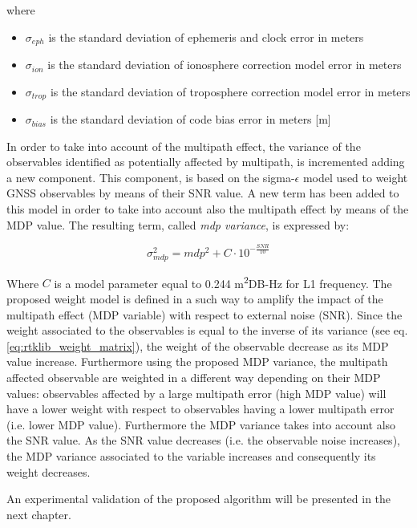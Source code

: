 where
\begin{itemize}
    \item $\sigma_{eph}$ is the standard deviation of ephemeris and clock error in meters
    \item $\sigma_{ion}$ is the standard deviation of ionosphere correction model error in meters
    \item $\sigma_{trop}$ is the standard deviation of troposphere correction model error in meters
    \item $\sigma_{bias}$ is the standard deviation of code bias error in meters [m]
\end{itemize}


In order to take into account of the multipath effect, the variance of the observables identified as potentially affected by multipath, is incremented adding a new component. This component, is based on the sigma-$\epsilon$ model \cite{Brunner:1999,Wieser:2000} used to weight GNSS observables by means of their SNR value. A new term has been added to this model in order to take into account also the multipath effect by means of the MDP value. The resulting term, called \textit{mdp variance}, is expressed by:

\begin{equation}
\sigma_{mdp}^{2}= mdp^{2}+C\cdot 10^{-\frac{SNR}{10}}
\label{eq:rtklib_mdp_variance}
\end{equation}

Where $C$ is a model parameter equal to 0.244 m\textsuperscript{2}DB-Hz for L1 frequency.
The proposed weight model is defined in a such way to amplify the impact of the multipath effect (MDP variable) with respect to external noise (SNR). 
 Since the weight associated to the observables is equal to the inverse of its variance (see eq. \ref{eq:rtklib_weight_matrix}), the weight of the observable decrease as its MDP value increase. Furthermore using the proposed MDP variance, the multipath affected observable are weighted in a different way depending on their MDP values: observables affected by a large multipath error (high MDP value) will have a lower weight with respect to observables having a lower multipath error (i.e. lower MDP value). Furthermore the MDP variance takes into account also the SNR value. As the SNR value decreases (i.e. the observable noise increases), the MDP variance associated to the variable increases and consequently its weight decreases.

An experimental validation of the proposed algorithm will be presented in the next chapter.
